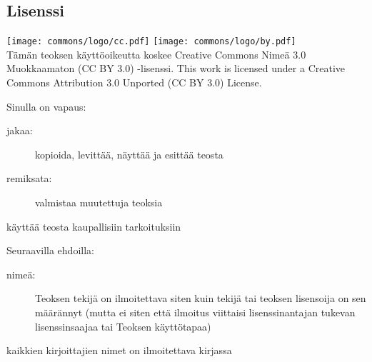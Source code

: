 \subsection*{Lisenssi}

\texttt{[image: commons/logo/cc.pdf]} \texttt{[image: commons/logo/by.pdf]} \\

Tämän teoksen käyttöoikeutta koskee Creative Commons Nimeä 3.0 Muokkaamaton (CC BY 3.0) -lisenssi.
This work is licensed under a Creative Commons Attribution 3.0 Unported (CC BY 3.0) License.


Sinulla on vapaus:
\begin{description}
\item[jakaa:] kopioida, levittää, näyttää ja esittää teosta
\item[remiksata:] valmistaa muutettuja teoksia
\item[käyttää teosta kaupallisiin tarkoituksiin]
\end{description}
Seuraavilla ehdoilla:
\begin{description}
\item[nimeä:] Teoksen tekijä on ilmoitettava siten kuin tekijä tai teoksen lisensoija on sen määrännyt (mutta ei siten että ilmoitus viittaisi lisenssinantajan tukevan lisenssinsaajaa tai Teoksen käyttötapaa)
\item[kaikkien kirjoittajien nimet on ilmoitettava kirjassa]
\end{description}

